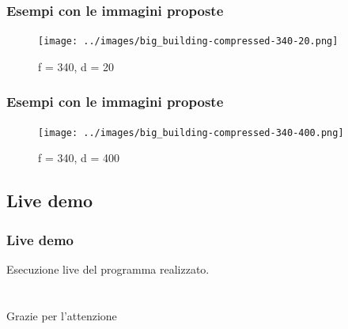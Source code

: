 \documentclass{beamer}
\begin{document}
\begin{frame}
	\frametitle{Esempi con le immagini proposte}
	\begin{figure}
		{\texttt{[image: ../images/big\_building-compressed-340-20.png]}}
		\caption{f = 340, d = 20}
	\end{figure}	
\end{frame}

\begin{frame}
	\frametitle{Esempi con le immagini proposte}
	\begin{figure}
		{\texttt{[image: ../images/big\_building-compressed-340-400.png]}}
		\caption{f = 340, d = 400}
	\end{figure}	
\end{frame}

\subsection{Live demo}
\begin{frame}
\frametitle{Live demo}
Esecuzione live del programma realizzato.
\end{frame}

\section*{}
\begin{frame}
\Huge{\centerline{Grazie per l'attenzione}}
\end{frame}
\end{document}
